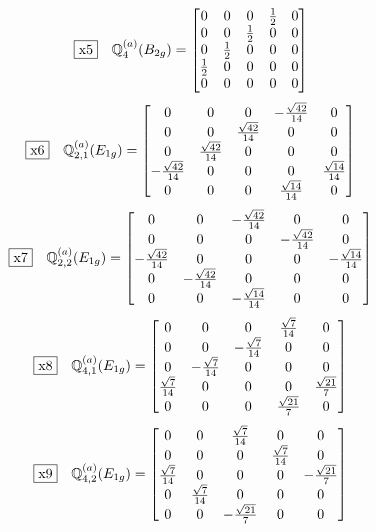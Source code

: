 \documentclass[fleqn,10pt,landscape]{jsarticle}
\begin{document}
\begin{dmath*}
\fbox{x5}\quad \mathbb{Q}_{4}^{(a)}(B_{2g})=\begin{bmatrix} 0 & 0 & 0 & \frac{1}{2} & 0 \\ 0 & 0 & \frac{1}{2} & 0 & 0 \\ 0 & \frac{1}{2} & 0 & 0 & 0 \\ \frac{1}{2} & 0 & 0 & 0 & 0 \\ 0 & 0 & 0 & 0 & 0 \end{bmatrix}
\end{dmath*}
\begin{dmath*}
\fbox{x6}\quad \mathbb{Q}_{2,1}^{(a)}(E_{1g})=\begin{bmatrix} 0 & 0 & 0 & - \frac{\sqrt{42}}{14} & 0 \\ 0 & 0 & \frac{\sqrt{42}}{14} & 0 & 0 \\ 0 & \frac{\sqrt{42}}{14} & 0 & 0 & 0 \\ - \frac{\sqrt{42}}{14} & 0 & 0 & 0 & \frac{\sqrt{14}}{14} \\ 0 & 0 & 0 & \frac{\sqrt{14}}{14} & 0 \end{bmatrix}
\end{dmath*}
\begin{dmath*}
\fbox{x7}\quad \mathbb{Q}_{2,2}^{(a)}(E_{1g})=\begin{bmatrix} 0 & 0 & - \frac{\sqrt{42}}{14} & 0 & 0 \\ 0 & 0 & 0 & - \frac{\sqrt{42}}{14} & 0 \\ - \frac{\sqrt{42}}{14} & 0 & 0 & 0 & - \frac{\sqrt{14}}{14} \\ 0 & - \frac{\sqrt{42}}{14} & 0 & 0 & 0 \\ 0 & 0 & - \frac{\sqrt{14}}{14} & 0 & 0 \end{bmatrix}
\end{dmath*}
\begin{dmath*}
\fbox{x8}\quad \mathbb{Q}_{4,1}^{(a)}(E_{1g})=\begin{bmatrix} 0 & 0 & 0 & \frac{\sqrt{7}}{14} & 0 \\ 0 & 0 & - \frac{\sqrt{7}}{14} & 0 & 0 \\ 0 & - \frac{\sqrt{7}}{14} & 0 & 0 & 0 \\ \frac{\sqrt{7}}{14} & 0 & 0 & 0 & \frac{\sqrt{21}}{7} \\ 0 & 0 & 0 & \frac{\sqrt{21}}{7} & 0 \end{bmatrix}
\end{dmath*}
\begin{dmath*}
\fbox{x9}\quad \mathbb{Q}_{4,2}^{(a)}(E_{1g})=\begin{bmatrix} 0 & 0 & \frac{\sqrt{7}}{14} & 0 & 0 \\ 0 & 0 & 0 & \frac{\sqrt{7}}{14} & 0 \\ \frac{\sqrt{7}}{14} & 0 & 0 & 0 & - \frac{\sqrt{21}}{7} \\ 0 & \frac{\sqrt{7}}{14} & 0 & 0 & 0 \\ 0 & 0 & - \frac{\sqrt{21}}{7} & 0 & 0 \end{bmatrix}
\end{dmath*}
\end{document}
